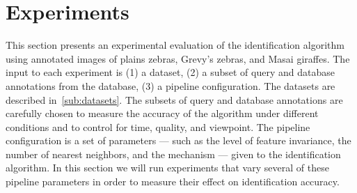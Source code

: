
\section{Experiments}\label{sec:experiments}

    This section presents an experimental evaluation of the
      identification algorithm using annotated images of plains zebras,
      Grevy's zebras, and Masai giraffes.
    The input to each experiment is
    (1) a dataset,
    (2) a subset of query and database annotations from the database,
    (3) a pipeline configuration.
    The datasets are described in~\cref{sub:datasets}.
    The subsets of query and database annotations are carefully chosen
      to measure the accuracy of the algorithm under different conditions
      and to control for time, quality, and viewpoint.
    The pipeline configuration is a set of parameters --- such as the
      level of feature invariance, the number of nearest neighbors, and
      the \namescoring{} mechanism --- given to the identification
      algorithm.
    In this section we will run experiments that vary several of these
      pipeline parameters in order to measure their effect on
      identification accuracy.

